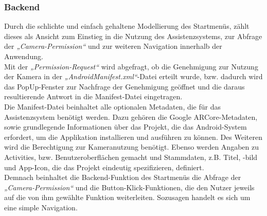 \pagebreak
\subsubsection{Backend}
Durch die schlichte und einfach gehaltene Modellierung des Startmenüs, zählt dieses als Ansicht zum Einstieg in die Nutzung des Assistenzsystems, zur Abfrage der 
\textit{„Camera-Permission“} und zur weiteren Navigation innerhalb der Anwendung.
\\ 
Mit der \textit{„Permission-Request“} wird abgefragt, ob die Genehmigung zur Nutzung der Kamera in der \textit{„AndroidManifest.xml“}-Datei erteilt wurde, bzw. 
dadurch wird das PopUp-Fenster zur Nachfrage der Genehmigung geöffnet und die daraus resultierende Antwort in die Manifest-Datei eingetragen. 
\\ 
\linebreak
Die Manifest-Datei beinhaltet alle optionalen Metadaten, die für das Assistenzsystem benötigt werden. Dazu gehören die Google ARCore-Metadaten, sowie 
grundlegende Informationen über das Projekt, die das Android-System erfordert, um die Applikation installieren und ausführen zu können. Des Weiteren wird 
die Berechtigung zur Kameranutzung benötigt. Ebenso werden Angaben zu Activities, bzw. Benutzeroberflächen gemacht und Stammdaten, z.B. Titel, -bild und 
App-Icon, die das Projekt eindeutig spezifizieren, definiert.
\\ 
\linebreak
Demnach beinhaltet die Backend-Funktion des Startmenüs die Abfrage der \textit{„Camera-Permission“} und die Button-Klick-Funktionen, die den Nutzer 
jeweils auf die von ihm gewählte Funktion weiterleiten. Sozusagen handelt es sich um eine simple Navigation.

